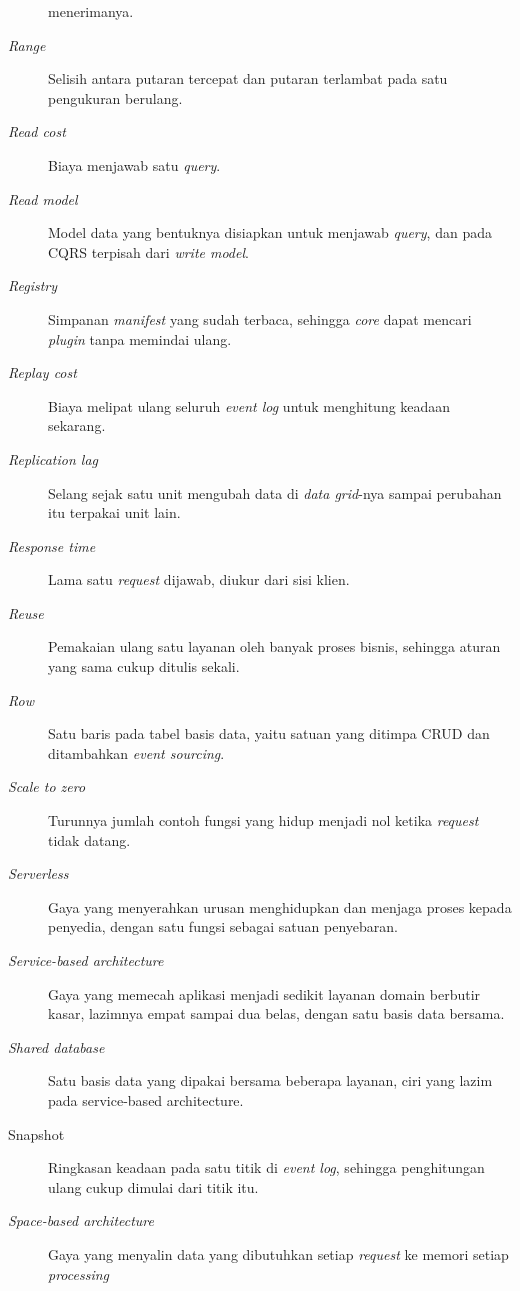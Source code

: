 \begin{description}
    menerimanya.
  \item[\textit{Range}] Selisih antara putaran tercepat dan putaran terlambat
    pada satu pengukuran berulang.
  \item[\textit{Read cost}] Biaya menjawab satu \textit{query}.
  \item[\textit{Read model}] Model data yang bentuknya disiapkan untuk
    menjawab \textit{query}, dan pada CQRS terpisah dari \textit{write model}.
  \item[\textit{Registry}] Simpanan \textit{manifest} yang sudah terbaca,
    sehingga \textit{core} dapat mencari \textit{plugin} tanpa memindai ulang.
  \item[\textit{Replay cost}] Biaya melipat ulang seluruh \textit{event log}
    untuk menghitung keadaan sekarang.
  \item[\textit{Replication lag}] Selang sejak satu unit mengubah data di
    \textit{data grid}-nya sampai perubahan itu terpakai unit lain.
  \item[\textit{Response time}] Lama satu \textit{request} dijawab, diukur dari sisi klien.
  \item[\textit{Reuse}] Pemakaian ulang satu layanan oleh banyak proses bisnis,
    sehingga aturan yang sama cukup ditulis sekali.
  \item[\textit{Row}] Satu baris pada tabel basis data, yaitu satuan yang
    ditimpa CRUD dan ditambahkan \textit{event sourcing}.
  \item[\textit{Scale to zero}] Turunnya jumlah contoh fungsi yang hidup menjadi
    nol ketika \textit{request} tidak datang.
  \item[\textit{Serverless}] Gaya yang menyerahkan urusan menghidupkan dan
    menjaga proses kepada penyedia, dengan satu fungsi sebagai satuan
    penyebaran.
  \item[\textit{Service-based architecture}] Gaya yang memecah aplikasi menjadi
    sedikit layanan domain berbutir kasar, lazimnya empat sampai dua belas,
    dengan satu basis data bersama.
  \item[\textit{Shared database}] Satu basis data yang dipakai bersama beberapa layanan, ciri
    yang lazim pada service-based architecture.
  \item[Snapshot] Ringkasan keadaan pada satu titik di \textit{event log},
    sehingga penghitungan ulang cukup dimulai dari titik itu.
  \item[\textit{Space-based architecture}] Gaya yang menyalin data yang
    dibutuhkan setiap \textit{request} ke memori setiap \textit{processing
}
\end{description}

